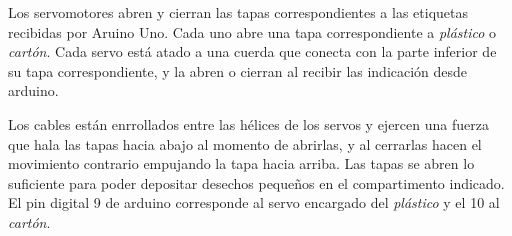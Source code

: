 Los servomotores abren y cierran las tapas correspondientes a las etiquetas recibidas por Aruino Uno. Cada uno abre una tapa correspondiente a \emph{plástico} o \emph{cartón}. Cada servo está atado a una cuerda que conecta con la parte inferior de su tapa correspondiente, y la abren o cierran al recibir las indicación desde arduino.

Los cables están enrrollados entre las hélices de los servos y ejercen una fuerza que hala las tapas hacia abajo al momento de abrirlas, y al cerrarlas hacen el movimiento contrario empujando la tapa hacia arriba. Las tapas se abren lo suficiente para poder depositar desechos pequeños en el compartimento indicado. El pin digital 9 de arduino corresponde al servo encargado del \emph{plástico} y el 10 al \emph{cartón}.